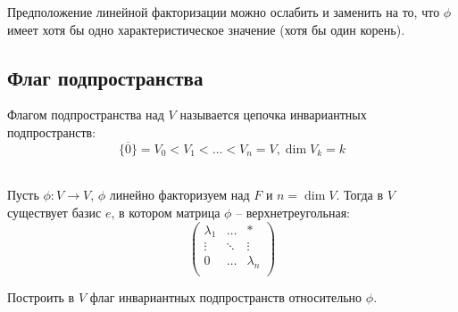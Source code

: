 \begin{note}
    Предположение линейной факторизации можно ослабить и заменить на то, что $\phi$ имеет хотя бы одно характеристическое значение (хотя бы один корень).
\end{note}

\subsection{Флаг подпространства}

\begin{definition}
    Флагом подпространства над $V$ называется цепочка инвариантных подпространств: 
    $$\{ \overline{0} \} = V_0 < V_1 < \dots < V_n = V, \dim V_k = k$$
\end{definition}

\begin{theorem}~ \\
    Пусть $\phi: V \to V$, $\phi$ линейно факторизуем над $F$ и  $n = \dim V$. Тогда в $V$ существует 
    базис $e$, в котором матрица $\phi$ -- верхнетреугольная:
    \begin{equation*}
        \left(
            \begin{array}{ccc}
            \lambda_1 & \dots & * \\
            \vdots & \ddots & \vdots \\
            0 & \dots & \lambda_n \\
            \end{array}
        \right)
    \end{equation*}
\end{theorem}

\begin{idea}
    Построить в $V$ флаг инвариантных подпространств относительно $\phi$.
\end{idea}


